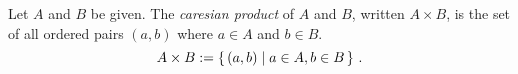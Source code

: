 \guard



\begin{defn}
\label{defn:cartesianProduct}
  Let $A$ and $B$ be given.
  The \emph{caresian product} of $A$ and $B$, written $A\times B$, is the set of all ordered pairs $(a,b)$ where $a\in A$ and $b\in B$.
  \[ A\times B := \left\{\, (a,b)\mid a\in A,b\in B\,\right\}\,.\]
\end{defn}
